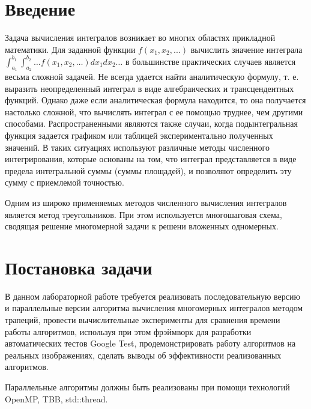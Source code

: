 \documentclass{report}
\begin{document}
\setcounter{page}{2}

\tableofcontents
\newpage

\section*{Введение}
\par 
Задача вычисления интегралов возникает во многих областях прикладной математики. Для заданной функции $f(x_{1}, x_{2}, ...)$ вычислить значение интеграла $\int_{a_{1}}^{b_{1}}\int_{a_{2}}^{b_{2}} \ldots f(x_{1}, x_{2}, \ldots)dx_{1}dx_{2}\ldots$ в большинстве практических случаев является весьма сложной задачей. Не всегда удается найти аналитическую формулу, т. е. выразить неопределенный интеграл в виде алгебраических и трансцендентных функций. Однако даже если аналитическая формула  находится, то она получается настолько сложной, что вычислять интеграл с ее помощью труднее, чем другими способами. Распространенными являются также случаи, когда подынтегральная функция задается графиком или таблицей экспериментально полученных значений. В таких ситуациях используют различные методы численного интегрирования, которые основаны на том, что интеграл представляется в виде предела интегральной суммы (суммы площадей), и позволяют определить эту сумму с приемлемой точностью.
\par
Одним из широко применяемых методов численного вычисления интегралов является метод треугольников. При этом используется многошаговая схема, сводящая решение многомерной задачи к решени вложенных одномерных.
\newpage

\section*{Постановка задачи}
\par В данном лабораторной работе требуется реализовать последовательную версию и параллельные версии алгоритма вычисления многомерных интегралов методом трапеций, провести вычислительные эксперименты для сравнения времени работы алгоритмов, используя при этом фрэймворк для разработки автоматических тестов Google Test, продемонстрировать работу алгоритмов на реальных изображениях, сделать выводы об эффективности реализованных алгоритмов.
\par Параллельные алгоритмы должны быть реализованы при помощи технологий OpenMP, TBB, std::thread.
\newpage
\end{document}
